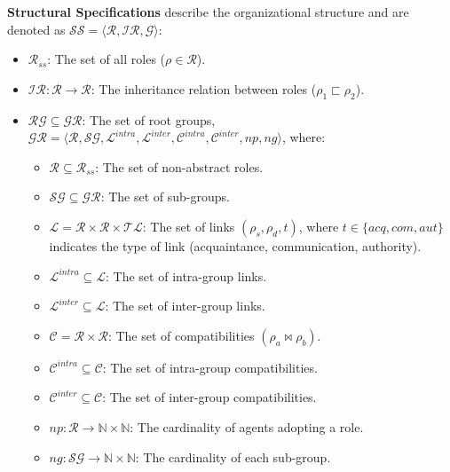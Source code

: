 \documentclass[conference]{IEEEtran}
\newcounter{relation}
\begin{document}
\textbf{Structural Specifications} describe the organizational structure and are denoted as $\mathcal{SS} = \langle \mathcal{R}, \mathcal{IR}, \mathcal{G} \rangle$:

\begin{itemize}
    \item $\mathcal{R}_{ss}$: The set of all roles ($\rho \in \mathcal{R}$).
    \item $\mathcal{IR}: \mathcal{R} \rightarrow \mathcal{R}$: The inheritance relation between roles ($\rho_1 \sqsubset \rho_2$).
    \item $\mathcal{RG} \subseteq \mathcal{GR}$: The set of root groups, $\mathcal{GR} = \langle \mathcal{R}, \mathcal{SG}, \mathcal{L}^{intra}, \mathcal{L}^{inter}, \mathcal{C}^{intra}, \mathcal{C}^{inter}, np, ng \rangle$, where:
          \begin{itemize}
              \item $\mathcal{R} \subseteq \mathcal{R}_{ss}$: The set of non-abstract roles.
              \item $\mathcal{SG} \subseteq \mathcal{GR}$: The set of sub-groups.
              \item $\mathcal{L} = \mathcal{R} \times \mathcal{R} \times \mathcal{TL}$: The set of links $(\rho_s, \rho_d, t)$, where $t \in \{acq, com, aut\}$ indicates the type of link (acquaintance, communication, authority).
              \item $\mathcal{L}^{intra} \subseteq \mathcal{L}$: The set of intra-group links.
              \item $\mathcal{L}^{inter} \subseteq \mathcal{L}$: The set of inter-group links.
              \item $\mathcal{C} = \mathcal{R} \times \mathcal{R}$: The set of compatibilities $(\rho_a \bowtie \rho_b)$.
              \item $\mathcal{C}^{intra} \subseteq \mathcal{C}$: The set of intra-group compatibilities.
              \item $\mathcal{C}^{inter} \subseteq \mathcal{C}$: The set of inter-group compatibilities.
              \item $np: \mathcal{R} \rightarrow \mathbb{N} \times \mathbb{N}$: The cardinality of agents adopting a role.
              \item $ng: \mathcal{SG} \rightarrow \mathbb{N} \times \mathbb{N}$: The cardinality of each sub-group.
          \end{itemize}
\end{itemize}
\end{document}
